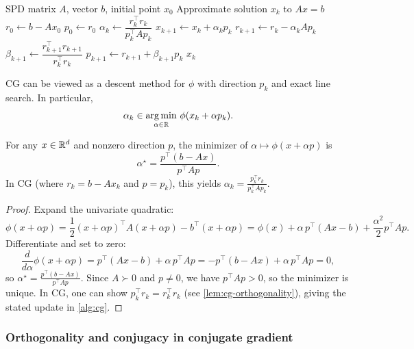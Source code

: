 \begin{algorithm}
  \caption{Conjugate gradient for $Ax=b$ with $A\succ 0$}
  \label{alg:cg}
  \begin{algorithmic}[1]
    \Require SPD matrix $A$, vector $b$, initial point $x_0$
    \Ensure Approximate solution $x_k$ to $Ax=b$
    \State $r_0 \gets b-Ax_0$
    \State $p_0 \gets r_0$
      \State $\alpha_k \gets \dfrac{r_k^\top r_k}{p_k^\top A p_k}$
      \State $x_{k+1} \gets x_k + \alpha_k p_k$
      \State $r_{k+1} \gets r_k - \alpha_k A p_k$
      \State $\beta_{k+1} \gets \dfrac{r_{k+1}^\top r_{k+1}}{r_k^\top r_k}$
      \State $p_{k+1} \gets r_{k+1} + \beta_{k+1} p_k$
    \EndFor
    \State \Return $x_k$
  \end{algorithmic}
\end{algorithm}

CG can be viewed as a descent method for $\phi$ with direction $p_k$ and exact line search. In particular,
\[
  \alpha_k \in \operatorname*{arg\,min}_{\alpha\in\mathbb{R}}\, \phi(x_k+\alpha p_k).
\]
\label{subsubsec:cg-alpha}

\begin{lemma}
\label{lem:cg-alpha}
For any $x\in\mathbb{R}^d$ and nonzero direction $p$, the minimizer of $\alpha\mapsto \phi(x+\alpha p)$ is
\[
  \alpha^\star = \frac{p^\top (b-Ax)}{p^\top A p}.
\]
In CG (where $r_k=b-Ax_k$ and $p=p_k$), this yields $\alpha_k = \frac{p_k^\top r_k}{p_k^\top A p_k}$.
\end{lemma}
\begin{proof}
Expand the univariate quadratic:
\[
  \phi(x+\alpha p)
  = \frac12 (x+\alpha p)^\top A (x+\alpha p) - b^\top(x+\alpha p)
  = \phi(x) + \alpha\,p^\top(Ax-b) + \frac{\alpha^2}{2}p^\top A p.
\]
Differentiate and set to zero:
\[
  \frac{d}{d\alpha}\phi(x+\alpha p)
  = p^\top(Ax-b) + \alpha\,p^\top A p
  = -p^\top(b-Ax) + \alpha\,p^\top A p
  = 0,
\]
so $\alpha^\star = \frac{p^\top(b-Ax)}{p^\top A p}$.
Since $A\succ 0$ and $p\neq 0$, we have $p^\top A p>0$, so the minimizer is unique.
In CG, one can show $p_k^\top r_k = r_k^\top r_k$ (see \cref{lem:cg-orthogonality}), giving the stated update in \cref{alg:cg}.
\end{proof}

\subsubsection{Orthogonality and conjugacy in conjugate gradient}
\label{subsubsec:cg-orthogonality}

